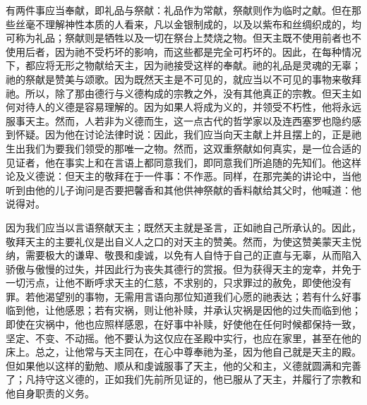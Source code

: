 有两件事应当奉献，即礼品与祭献：礼品作为常献，祭献则作为临时之献。但在那些丝毫不理解神性本质的人看来，凡以金银制成的，以及以紫布和丝绸织成的，均可称为礼品；祭献则是牺牲以及一切在祭台上焚烧之物。但天主既不使用前者也不使用后者，因为祂不受朽坏的影响，而这些都是完全可朽坏的。因此，在每种情况下，都应将无形之物献给天主，因为祂接受这样的奉献。祂的礼品是灵魂的无辜；祂的祭献是赞美与颂歌。因为既然天主是不可见的，就应当以不可见的事物来敬拜祂。所以，除了那由德行与义德构成的宗教之外，没有其他真正的宗教。但天主如何对待人的义德是容易理解的。因为如果人将成为义的，并领受不朽性，他将永远服事天主。然而，人若非为义德而生，这一点古代的哲学家以及连西塞罗也隐约感到怀疑。因为他在讨论法律时说：因此，我们应当向天主献上并且摆上的，正是祂生出我们为要我们领受的那唯一之物。然而，这双重祭献如何真实，是一位合适的见证者，他在事实上和在言语上都同意我们，即同意我们所追随的先知们。他这样论及义德说：但天主的敬拜在于一件事：不作恶。同样，在那完美的讲论中，当他听到由他的儿子询问是否要把馨香和其他供神祭献的香料献给其父时，他喊道：他说得对。\par

因为我们应当以言语祭献天主；既然天主就是圣言，正如祂自己所承认的。因此，敬拜天主的主要礼仪是出自义人之口的对天主的赞美。然而，为使这赞美蒙天主悦纳，需要极大的谦卑、敬畏和虔诚，以免有人自恃于自己的正直与无辜，从而陷入骄傲与傲慢的过失，并因此行为丧失其德行的赏报。但为获得天主的宠幸，并免于一切污点，让他不断呼求天主的仁慈，不求别的，只求罪过的赦免，即使他没有罪。若他渴望别的事物，无需用言语向那位知道我们心愿的祂表达；若有什么好事临到他，让他感恩；若有灾祸，则让他补赎，并承认灾祸是因他的过失而临到他；即使在灾祸中，他也应照样感恩，在好事中补赎，好使他在任何时候都保持一致，坚定、不变、不动摇。他不要认为这仅应在圣殿中实行，也应在家里，甚至在他的床上。总之，让他常与天主同在，在心中尊奉祂为圣，因为他自己就是天主的殿。但如果他以这样的勤勉、顺从和虔诚服事了天主，他的父和主，义德就圆满和完善了；凡持守这义德的，正如我们先前所见证的，他已服从了天主，并履行了宗教和他自身职责的义务。\par



